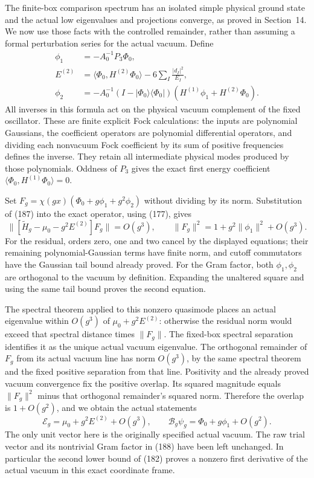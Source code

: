 \documentclass[11pt]{article}
\begin{document}
The finite-box comparison spectrum has an isolated simple physical
ground state and the actual low eigenvalues and projections converge,
as proved in Section~14. We now use those facts with the controlled
remainder, rather than assuming a formal perturbation series for the
actual vacuum. Define
\begin{align}
 \phi_1&=-A_0^{-1}P_3\Phi_0,\nonumber\\
 E^{(2)}&=\langle\Phi_0,H^{(2)}\Phi_0\rangle
                  -6\sum_I\frac{|d_I|^2}{E_I},\nonumber\\
 \phi_2&=-A_0^{-1}(I-|\Phi_0\rangle\langle\Phi_0|)
                       (H^{(1)}\phi_1+H^{(2)}\Phi_0).
       \label{eq:vertex-quasimode-coefficients}
\end{align}
All inverses in this formula act on the physical vacuum complement
of the fixed oscillator. These are finite explicit Fock calculations:
the inputs are polynomial Gaussians, the coefficient operators are
polynomial differential operators, and dividing each nonvacuum Fock
coefficient by its sum of positive frequencies defines the inverse.
They retain all intermediate physical modes produced by those
polynomials. Oddness of $P_3$ gives the exact first energy coefficient
$\langle\Phi_0,H^{(1)}\Phi_0\rangle=0$.

Set $F_g=\chi(gx)(\Phi_0+g\phi_1+g^2\phi_2)$ without dividing
by its norm. Substitution of (187)
into the exact operator, using (177), gives
\begin{equation}\label{eq:vertex-quasimode-residual}
 \|[\widetilde H_g-\mu_0-g^2E^{(2)}]F_g\|=O(g^3),
 \qquad \|F_g\|^2=1+g^2\|\phi_1\|^2+O(g^3).
\end{equation}
For the residual, orders zero, one and two cancel by the displayed
equations; their remaining polynomial-Gaussian terms have finite norm,
and cutoff commutators have the Gaussian tail bound already proved.
For the Gram factor, both $\phi_1,\phi_2$ are orthogonal to the
vacuum by definition. Expanding the unaltered square and using the
same tail bound proves the second equation.

The spectral theorem applied to this nonzero quasimode places an
actual eigenvalue within $O(g^3)$ of $\mu_0+g^2E^{(2)}$: otherwise
the residual norm would exceed that spectral distance times
$\|F_g\|$. The fixed-box spectral separation identifies it as the
unique actual vacuum eigenvalue. The orthogonal remainder of $F_g$
from its actual vacuum line has norm $O(g^3)$, by the same spectral
theorem and the fixed positive separation from that line. Positivity
and the already proved vacuum convergence fix the positive overlap.
Its squared magnitude equals $\|F_g\|^2$ minus that orthogonal
remainder's squared norm. Therefore the overlap is $1+O(g^2)$,
and we obtain the actual statements
\begin{equation}\label{eq:vertex-actual-vacuum}
 \mathcal E_g=\mu_0+g^2E^{(2)}+O(g^3),\qquad
 \mathcal B_g\psi_g=\Phi_0+g\phi_1+O(g^2).
\end{equation}
The only unit vector here is the originally specified actual vacuum.
The raw trial vector and its nontrivial Gram factor in
(188) have been left unchanged.
In particular the second lower bound of
(182) proves a nonzero first derivative
of the actual vacuum in this exact coordinate frame.
\end{document}
